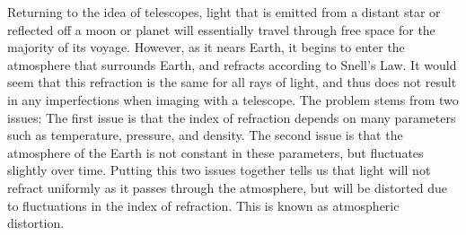 \documentclass[]{article}
\begin{document}
Returning to the idea of telescopes, light that is emitted from a distant star or reflected off a moon or planet will essentially travel through free space for the majority of its voyage. However, as it nears Earth, it begins to enter the atmosphere that surrounds Earth, and refracts according to Snell's Law. It would seem that this refraction is the same for all rays of light, and thus does not result in any imperfections when imaging with a telescope. The problem stems from two issues: The first issue is that the index of refraction depends on many parameters such as temperature, pressure, and density. The second issue is that the atmosphere of the Earth is not constant in these parameters, but fluctuates slightly over time. Putting this two issues together tells us that light will not refract uniformly as it passes through the atmosphere, but will be distorted due to fluctuations in the index of refraction. This is known as atmospheric distortion.
\end{document}
